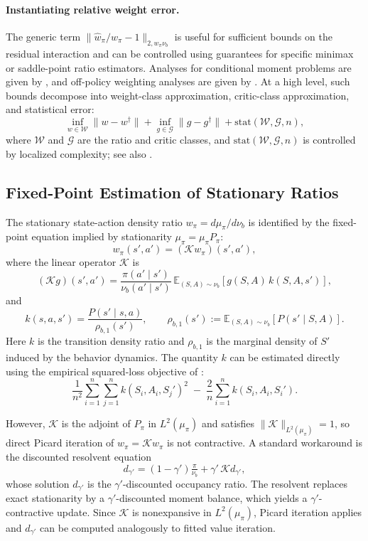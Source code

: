 \documentclass{article}
\newcommand{\E}{\mathbb{E}}
\theoremstyle{plain}
\theoremstyle{definition}
\theoremstyle{remark}
\begin{document}
\paragraph{Instantiating relative weight error.}
The generic term
\(\|\widehat w_\pi/w_\pi-1\|_{2,w_\pi\nu_b}\) is useful for sufficient bounds on
the residual interaction and can be controlled using guarantees for specific
minimax or saddle-point ratio estimators. Analyses for conditional
moment problems are given by
\citet{dikkala2020minimax,olivas2025source}, and off-policy weighting analyses
are given by \citet{uehara2020minimax,wang2023projected}. At a high level, such
bounds decompose into weight-class approximation, critic-class approximation,
and statistical error:
\[
\inf_{w\in\mathcal W}\|w-w^\dagger\|
+
\inf_{g\in\mathcal G}\|g-g^\dagger\|
+
\mathrm{stat}(\mathcal W,\mathcal G,n),
\]
where \(\mathcal W\) and \(\mathcal G\) are the ratio and critic classes, and
\(\mathrm{stat}(\mathcal W,\mathcal G,n)\) is controlled by localized
complexity; see also \citet{bennett2023minimax}.


\subsection{Fixed-Point Estimation of Stationary Ratios}
\label{sec::fixedstationary}

The stationary state-action density ratio
$w_{\pi} = d{\mu_\pi} / d\nu_b$ is identified by the fixed-point equation
implied by stationarity ${\mu_\pi} = {\mu_\pi} P_\pi$:
\[
w_{\pi}(s',a') = (\mathcal K w_{\pi})(s',a'),
\]
where the linear operator $\mathcal K$ is
\[
(\mathcal K g)(s',a')
=
\frac{\pi(a' \mid s')}{\nu_b(a' \mid s')}
\,\E_{(S,A)\sim\nu_b}\!\left[g(S,A)\,k(S,A,s')\right],
\]
and
\[
k(s,a,s')
=
\frac{P(s' \mid s,a)}{\rho_{b,1}(s')},
\qquad
\rho_{b,1}(s')
:=
\E_{(S,A)\sim\nu_b}\!\left[P(s' \mid S,A)\right].
\]
Here \(k\) is the transition density ratio and \(\rho_{b,1}\) is the marginal
density of \(S'\) induced by the behavior dynamics.
The quantity $k$ can be estimated directly using the empirical squared-loss
objective of \citet{hines2025learning}:
\[
\frac{1}{n^2}\sum_{i=1}^n \sum_{j=1}^n
k(S_i,A_i,S_j')^2
\;-\;
\frac{2}{n}\sum_{i=1}^n k(S_i,A_i,S_i').
\]

However, $\mathcal K$ is the adjoint of $P_\pi$ in $L^2({\mu_\pi})$ and satisfies
$\|\mathcal K\|_{L^2({\mu_\pi})} = 1$, so direct Picard iteration of 
$w_{\pi} = \mathcal K w_{\pi}$ is not contractive. A standard workaround is the
discounted resolvent equation
\[
d_{\gamma'} = (1-\gamma')\tfrac{\pi}{\nu_b} + \gamma'\,\mathcal K d_{\gamma'},
\]
whose solution $d_{\gamma'}$ is the $\gamma'$-discounted occupancy ratio.
The resolvent replaces exact stationarity by a $\gamma'$-discounted moment
balance, which yields a $\gamma'$-contractive update. Since $\mathcal K$ is
nonexpansive in $L^2({\mu_\pi})$, Picard iteration applies and 
\(d_{\gamma'}\) can be computed analogously to fitted value iteration.
\end{document}
